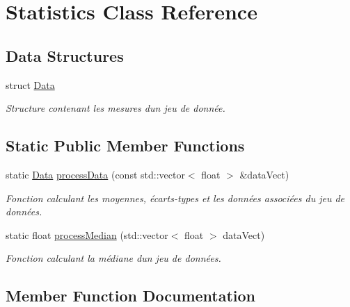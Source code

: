 \hypertarget{classStatistics}{}\section{Statistics Class Reference}
\label{classStatistics}
\subsection*{Data Structures}
\begin{DoxyCompactItemize}
\item 
struct \hyperlink{structStatistics_1_1Data}{Data}
\begin{DoxyCompactList}\small\item\em Structure contenant les mesures d\textquotesingle{}un jeu de donnée. \end{DoxyCompactList}\end{DoxyCompactItemize}
\subsection*{Static Public Member Functions}
\begin{DoxyCompactItemize}
\item 
static \hyperlink{structStatistics_1_1Data}{Data} \hyperlink{classStatistics_aaa2152a3f262ce8d003663f993420c4c}{process\+Data} (const std\+::vector$<$ float $>$ \&data\+Vect)
\begin{DoxyCompactList}\small\item\em Fonction calculant les moyennes, écarts-\/types et les données associées du jeu de données. \end{DoxyCompactList}\item 
static float \hyperlink{classStatistics_ae1c12077162711aa0ea8b4ee6e15b4da}{process\+Median} (std\+::vector$<$ float $>$ data\+Vect)
\begin{DoxyCompactList}\small\item\em Fonction calculant la médiane d\textquotesingle{}un jeu de données. \end{DoxyCompactList}\end{DoxyCompactItemize}


\subsection{Member Function Documentation}
\mbox{\label{classStatistics_aaa2152a3f262ce8d003663f993420c4c}} 
